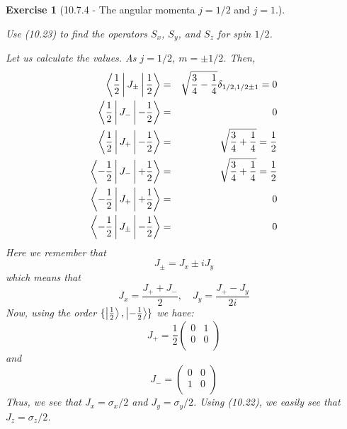 \documentclass[12pt]{article}
\def\be{\begin{equation}}
\def\ee{\end{equation}}
\def\bea{\begin{eqnarray*}}
\def\eea{\end{eqnarray*}}
\def\f{\frac}
\newtheorem{exercise}{Exercise}
\begin{document}
	
	\begin{exercise}[10.7.4 - The angular momenta $j=1/2$ and $j = 1$.] 
		\begin{exercises}
			\item  Use (10.23) to find the operators $S_x$, $S_y$, and $S_z$ for spin $1/2$.
			\begin{multianswer}
				Let us calculate the values. As $j=1/2$, $m=\pm 1/2$. Then,
				\bea
					\Braket{ \f{1}{2} | J_\pm | \f{1}{2}} &=& \sqrt{ \f{3}{4} - \f{1}{4}} \delta_{1/2, 1/2\pm1} = 0 \\
					\Braket{ \f{1}{2} | J_- | -\f{1}{2}} &=& 0 \\
					\Braket{ \f{1}{2} | J_+ | -\f{1}{2}} &=& \sqrt{ \f{3}{4} + \f{1}{4}}  = \f{1}{2} \\ 
					\Braket{ -\f{1}{2} | J_- | +\f{1}{2}} &=& \sqrt{ \f{3}{4} + \f{1}{4}}  = \f{1}{2} \\
					\Braket{ -\f{1}{2} | J_+ | +\f{1}{2}} &=& 0 \\
					\Braket{ -\f{1}{2} | J_\pm | -\f{1}{2}} &=& 0 \\
				\eea
				Here we remember that
				\be
					J_\pm = J_x \pm i J_y 
				\ee
				which means that
				\be
					J_x = \f{J_+ + J_-}{2}, \quad J_y = \f{J_+ - J_y}{2i}
				\ee
				Now, using the order $\{\Ket{\f{1}{2}}, \Ket{-\f{1}{2}}\}$ we have:
				\be
					J_+ = \f{1}{2}
						\begin{pmatrix}
							0 & 1 \\
							0 & 0 \\
						\end{pmatrix}
				\ee
				and
				\be
					J_- = 
					\begin{pmatrix}
						0 & 0 \\
						1 & 0 \\
					\end{pmatrix}
				\ee
				Thus, we see that $J_x=\sigma_x/2$ and $J_y=\sigma_y/2$. Using (10.22), we easily see that $J_z=\sigma_z/2$. 
			\end{multianswer}
			

\end{exercises}
\end{exercise}
\end{document}

